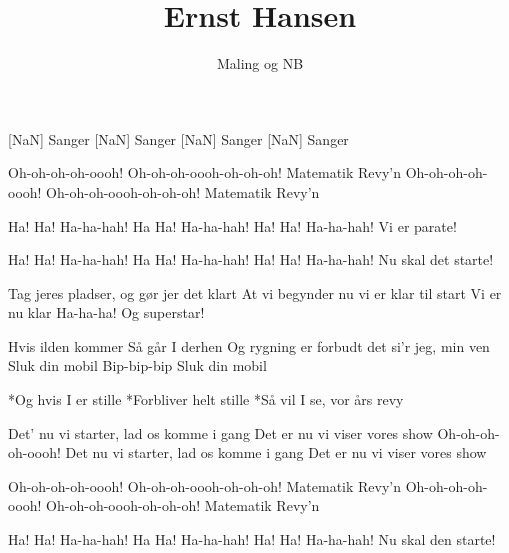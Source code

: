 \documentclass[a4paper,11pt]{article}
\title{Ernst Hansen}
\author{Maling og NB}
\begin{document}
\maketitle

\begin{roles}
[NaN] Sanger
[NaN] Sanger
[NaN] Sanger
[NaN] Sanger
\end{roles}

\begin{song}

 Oh-oh-oh-oh-oooh! Oh-oh-oh-oooh-oh-oh-oh!
Matematik Revy'n
Oh-oh-oh-oh-oooh! Oh-oh-oh-oooh-oh-oh-oh!
Matematik Revy'n

Ha! Ha! Ha-ha-hah! Ha Ha! Ha-ha-hah!
Ha! Ha! Ha-ha-hah! Vi er parate!

Ha! Ha! Ha-ha-hah! Ha Ha! Ha-ha-hah!
Ha! Ha! Ha-ha-hah! Nu skal det starte!

Tag jeres pladser,
og gør jer det klart
At vi begynder nu
vi er klar til start
Vi er nu klar
Ha-ha-ha!
Og superstar!

Hvis ilden kommer
Så går I derhen
Og rygning er forbudt
det si'r jeg, min ven
Sluk din mobil
Bip-bip-bip
Sluk din mobil

*Og hvis I er stille
*Forbliver helt stille
*Så vil I se, vor års revy

Det' nu vi starter, lad os komme i gang
Det er nu vi viser vores show
Oh-oh-oh-oh-oooh!
Det nu vi starter, lad os komme i gang
Det er nu vi viser vores show

Oh-oh-oh-oh-oooh! Oh-oh-oh-oooh-oh-oh-oh!
Matematik Revy'n
Oh-oh-oh-oh-oooh! Oh-oh-oh-oooh-oh-oh-oh!
Matematik Revy'n

Ha! Ha! Ha-ha-hah! Ha Ha! Ha-ha-hah!
Ha! Ha! Ha-ha-hah! Nu skal den starte!
\end{song}
\end{document}

